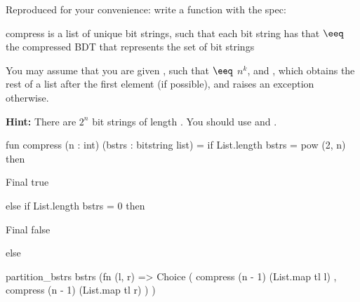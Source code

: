 \begin{parts}
    \newpage

    Reproduced for your convenience: write a function  with the
    spec:

    \spec
      {compress}
      {}
      { is a list of unique bit strings, such that each bit string  has
      that }
      { $\eeq$ the compressed BDT that
      represents the set of bit strings }

    You may assume that you are given , such that
     $\eeq$ $n^k$, and , which
    obtains the rest of a list after the first element (if possible), and raises an exception otherwise.

    \textbf{Hint:} There are $2^n$ bit strings of length . You should use
     and .

    \begin{codeblock}
      fun compress (n : int) (bstrs : bitstring list) =
        if List.length bstrs = pow (2, n) then
    \end{codeblock}
    \vspace{-0.2cm}
    \begin{solutionorbox}[4em]
      \begin{codeblock}
        Final true
      \end{codeblock}
    \end{solutionorbox}

    \begin{codeblock}[autogobble=false]
  else if List.length bstrs = 0 then
    \end{codeblock}
  \vspace{-0.6cm}

    \begin{solutionorbox}[4em]
      \begin{codeblock}
        Final false
      \end{codeblock}
    \end{solutionorbox}

    \begin{codeblock}[autogobble=false]
  else
    \end{codeblock}
    \vspace{-0.6cm}
    \begin{solutionorbox}[20em]
      \begin{codeblock}
            partition_bstrs bstrs (fn (l, r) =>
              Choice
                ( compress (n - 1) (List.map tl l)
                , compress (n - 1) (List.map tl r)
                )
            )
      \end{codeblock}
    \end{solutionorbox}


\end{parts}
